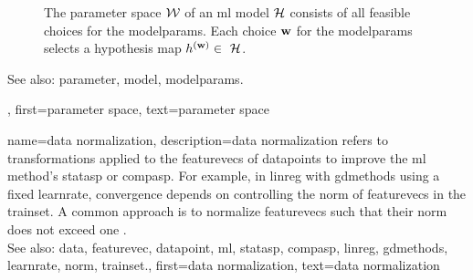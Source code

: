 {{\begin{figure}[H]
\begin{center}
			\end{center} 
			\caption{The \gls{parameter} space $\mathcal{W}$ of an \gls{ml} \gls{model} $\mathcal{H}$ consists of all 
			feasible choices for the \gls{modelparams}. Each choice ${\bf w}$ for the \gls{modelparams} 
			selects a \gls{hypothesis} \gls{map} $\hypothesis^{(\weights)} \in \hypospace$.
				 \label{fig_param_space_dict}} 
\end{figure}
		See also: \gls{parameter}, \gls{model}, \gls{modelparams}.},
	first={parameter space},
	text={parameter space}
}

{name={data normalization},
	description={\Gls{data} normalization refers to transformations 
		applied to the \glspl{featurevec} of \glspl{datapoint} to improve the \gls{ml} method's 
		\gls{statasp} or \gls{compasp}. For example, in \gls{linreg} with \gls{gdmethods} using 
		a fixed \gls{learnrate}, convergence depends on controlling the \gls{norm} of \glspl{featurevec} 
		in the \gls{trainset}. A common approach is to normalize \glspl{featurevec} such that their 
		\gls{norm} does not exceed one \cite[Ch.\ 5]{MLBasics}.
				\\
		See also: \gls{data}, \gls{featurevec}, \gls{datapoint}, \gls{ml}, \gls{statasp}, \gls{compasp}, \gls{linreg}, \gls{gdmethods}, \gls{learnrate}, \gls{norm}, \gls{trainset}.},
	first={data normalization},
	text={data normalization}
}

